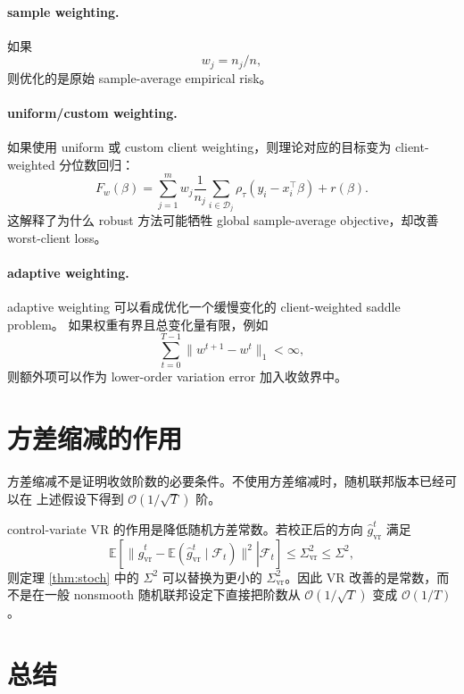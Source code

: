 \documentclass[UTF8,a4paper,11pt]{ctexart}
\begin{document}
\paragraph{sample weighting.}
如果
\[
    w_j = n_j/n,
\]
则优化的是原始 sample-average empirical risk。

\paragraph{uniform/custom weighting.}
如果使用 uniform 或 custom client weighting，则理论对应的目标变为 client-weighted
分位数回归：
\begin{equation}
    F_w(\beta)
    =
    \sum_{j=1}^m
    w_j
    \frac{1}{n_j}
    \sum_{i\in\mathcal{D}_j}
    \rho_\tau(y_i-x_i^\top\beta)
    +
    r(\beta).
\end{equation}
这解释了为什么 robust 方法可能牺牲 global sample-average objective，却改善
worst-client loss。

\paragraph{adaptive weighting.}
adaptive weighting 可以看成优化一个缓慢变化的 client-weighted saddle problem。
如果权重有界且总变化量有限，例如
\[
    \sum_{t=0}^{T-1}
    \|w^{t+1}-w^t\|_1
    <
    \infty,
\]
则额外项可以作为 lower-order variation error 加入收敛界中。

\section{方差缩减的作用}

方差缩减不是证明收敛阶数的必要条件。不使用方差缩减时，随机联邦版本已经可以在
上述假设下得到 $\mathcal{O}(1/\sqrt{T})$ 阶。

control-variate VR 的作用是降低随机方差常数。若校正后的方向
$\widehat{g}_{\mathrm{vr}}^t$ 满足
\[
    \mathbb{E}
    \left[
    \left.
    \|\widehat{g}_{\mathrm{vr}}^t
    -
    \mathbb{E}(\widehat{g}_{\mathrm{vr}}^t\mid\mathcal{F}_t)\|^2
    \right|
    \mathcal{F}_t
    \right]
    \le
    \Sigma_{\mathrm{vr}}^2
    \le
    \Sigma^2,
\]
则定理 \ref{thm:stoch} 中的 $\Sigma^2$ 可以替换为更小的
$\Sigma_{\mathrm{vr}}^2$。因此 VR 改善的是常数，而不是在一般 nonsmooth
随机联邦设定下直接把阶数从 $\mathcal{O}(1/\sqrt{T})$ 变成
$\mathcal{O}(1/T)$。

\section{总结}
\end{document}
